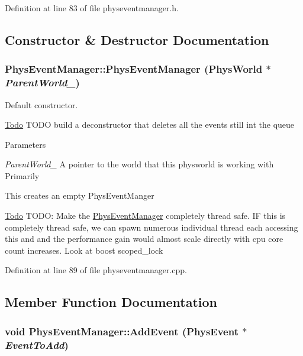 Definition at line 83 of file physeventmanager.h.

\subsection{Constructor \& Destructor Documentation}
\hypertarget{classPhysEventManager_a1355f36d99de303cec6f3b27cadaa9ff}{
\subsubsection[{PhysEventManager}]{\setlength{\rightskip}{0pt plus 5cm}PhysEventManager::PhysEventManager ({\bf PhysWorld} $\ast$ {\em ParentWorld\_\-})}}
\label{d5/dd7/classPhysEventManager_a1355f36d99de303cec6f3b27cadaa9ff}


Default constructor. \begin{Desc}
\item[\hyperlink{todo__todo000006}{Todo}]TODO build a deconstructor that deletes all the events still int the queue \end{Desc}

\begin{DoxyParams}{Parameters}
\item[{\em ParentWorld\_\-}]A pointer to the world that this physworld is working with Primarily\end{DoxyParams}
This creates an empty PhysEventManger

\begin{Desc}
\item[\hyperlink{todo__todo000005}{Todo}]TODO: Make the \hyperlink{classPhysEventManager}{PhysEventManager} completely thread safe. IF this is completely thread safe, we can spawn numerous individual thread each accessing this and and the performance gain would almost scale directly with cpu core count increases. Look at boost scoped\_\-lock \end{Desc}


Definition at line 89 of file physeventmanager.cpp.

\subsection{Member Function Documentation}
\hypertarget{classPhysEventManager_a7c9bb46b17f6d9245817a402dc6a2f6f}{
\subsubsection[{AddEvent}]{\setlength{\rightskip}{0pt plus 5cm}void PhysEventManager::AddEvent ({\bf PhysEvent} $\ast$ {\em EventToAdd})}}
\label{d5/dd7/classPhysEventManager_a7c9bb46b17f6d9245817a402dc6a2f6f}


